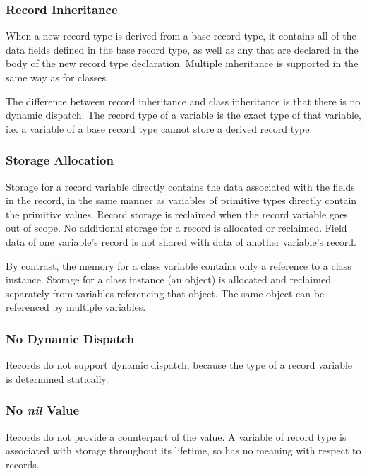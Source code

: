 \subsubsection{Record Inheritance}
\label{Record_Inheritance}

When a new record type is derived from a base record type, it contains all of
the data fields defined in the base record type, as well as any that are
declared in the body of the new record type declaration.
Multiple inheritance is supported in the same way as for classes.

The difference between record inheritance and class
inheritance is that there is no dynamic dispatch.  The record type of
a variable is the exact type of that variable, i.e. a variable of a
base record type cannot store a derived record type.

\subsubsection{Storage Allocation}
\label{Record_Storage}

Storage for a record variable directly contains the data associated
with the fields in the record, in the same manner as variables
of primitive types directly contain the primitive values.
Record storage is reclaimed when the record variable goes out of scope.
No additional storage for a record is allocated or reclaimed.
Field data of one variable's record is not shared with data
of another variable's record.

By contrast, the memory for a class variable contains only a reference to a
class instance.  Storage for a class instance (an object) is allocated and reclaimed
separately from variables referencing that object.  The same object
can be referenced by multiple variables.

\subsubsection{No Dynamic Dispatch}

Records do not support dynamic dispatch, because the type of a record variable
is determined statically.

\subsubsection{No {\em nil} Value}

Records do not provide a counterpart of the  value.  A variable of
record type is associated with storage throughout its lifetime, so 
has no meaning with respect to records.

